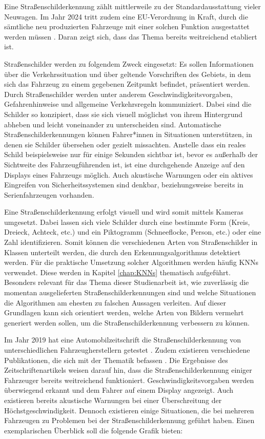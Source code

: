 Eine Straßenschilderkennung zählt mittlerweile zu der Standardausstattung vieler Neuwagen. Im Jahr 2024 tritt zudem eine EU-Verordnung in Kraft, durch die sämtliche neu produzierten Fahrzeuge mit einer solchen Funktion ausgestattet werden müssen \cite{eu-regulation}. Daran zeigt sich, dass das Thema bereits weitreichend etabliert ist.

Straßenschilder werden zu folgendem Zweck eingesetzt: Es sollen Informationen über die Verkehrssituation und über geltende Vorschriften des Gebiets, in dem sich das Fahrzeug zu einem gegebenen Zeitpunkt befindet, präsentiert werden. Durch Straßenschilder werden unter anderem Geschwindigkeitsvorgaben, Gefahrenhinweise und allgemeine Verkehrsregeln kommuniziert. Dabei sind die Schilder so konzipiert, dass sie sich visuell möglichst von ihrem Hintergrund abheben und leicht voneinander zu unterscheiden sind. Automatische Straßenschilderkennungen können Fahrer*innen in Situationen unterstützen, in denen sie Schilder übersehen oder gezielt missachten. Anstelle dass ein reales Schild beispielsweise nur für einige Sekunden sichtbar ist, bevor es außerhalb der Sichtweite des Fahrzeugführenden ist, ist eine durchgehende Anzeige auf den Displays eines Fahrzeugs möglich. Auch akustische Warnungen oder ein aktives Eingreifen von Sicherheitssystemen sind denkbar, beziehungsweise bereits in Serienfahrzeugen vorhanden.

Eine Straßenschilderkennung erfolgt visuell und wird somit mittels Kameras umgesetzt. Dabei lassen sich viele Schilder durch eine bestimmte Form (Kreis, Dreieck, Achteck, etc.) und ein Piktogramm (Schneeflocke, Person, etc.) oder eine Zahl identifizieren. Somit können die verschiedenen Arten von Straßenschilder in Klassen unterteilt werden, die durch den Erkennungsalgorithmus detektiert werden. Für die praktische Umsetzung solcher Algorithmen werden häufig \acp{KNN} verwendet. Diese werden in Kapitel \ref{chap:KNNs} thematisch aufgeführt. Besonders relevant für das Thema dieser Studienarbeit ist, wie zuverlässig die momentan ausgelieferten Straßenschilderkennungen sind und welche Situationen die Algorithmen am ehesten zu falschen Aussagen verleiten. Auf dieser Grundlagen kann sich orientiert werden, welche Arten von Bildern vermehrt generiert werden sollen, um die Straßenschilderkennung verbessern zu können.

Im Jahr 2019 hat eine Automobilzeitschrift die Straßenschilderkennung von unterschiedlichen Fahrzeugherstellern getestet \cite{strassenschilderkennungTest}. Zudem existieren verschiedene Publikationen, die sich mit der Thematik befassen \cite{traffic-sign-detection-review-2014}. Die Ergebnisse des Zeitschriftenartikels weisen darauf hin, dass die Straßenschilderkennung einiger Fahrzeuger bereits weitreichend funktioniert. Geschwindigkeitsvorgaben werden überwiegend erkannt und dem Fahrer auf einem Display angezeigt. Auch existieren bereits akustische Warnungen bei einer Überschreitung der Höchstgeschwindigkeit. Dennoch existieren einige Situationen, die bei mehreren Fahrzeugen zu Problemen bei der Straßenschilderkennung geführt haben. Einen exemplarischen Überblick soll die folgende Grafik bieten: \cite{strassenschilderkennungTest} 

